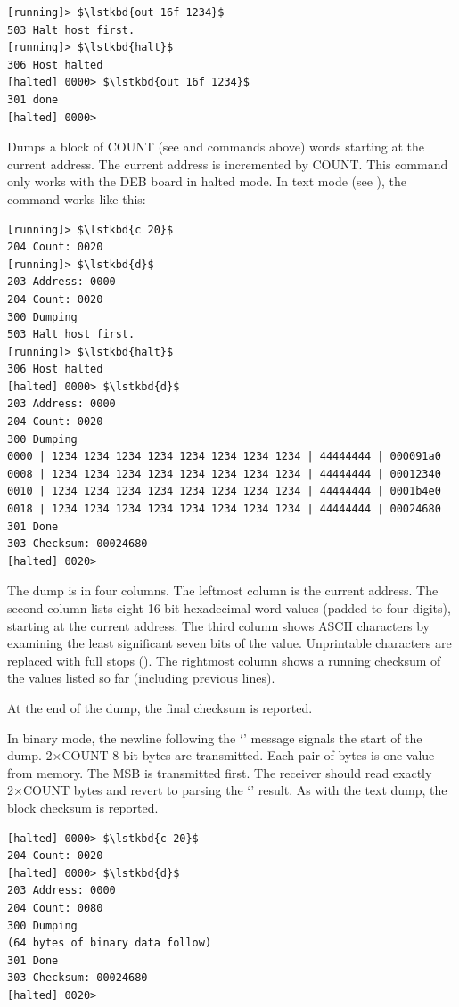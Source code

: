 \begin{description}
{\small
\begin{lstlisting}[style=deb]
[running]> $\lstkbd{out 16f 1234}$
503 Halt host first.
[running]> $\lstkbd{halt}$
306 Host halted
[halted] 0000> $\lstkbd{out 16f 1234}$
301 done
[halted] 0000> 
\end{lstlisting}
}


\item{\bfseries{}} Dumps a block of COUNT (see  and 
  commands above) words starting at the current address. The current
  address is incremented by COUNT. This command only works with the
  \gls{DEB} board in halted mode. In text mode (see ), the
  command works like this:

{\small
\begin{lstlisting}[style=deb]
[running]> $\lstkbd{c 20}$
204 Count: 0020
[running]> $\lstkbd{d}$
203 Address: 0000
204 Count: 0020
300 Dumping
503 Halt host first.
[running]> $\lstkbd{halt}$
306 Host halted
[halted] 0000> $\lstkbd{d}$
203 Address: 0000
204 Count: 0020
300 Dumping
0000 | 1234 1234 1234 1234 1234 1234 1234 1234 | 44444444 | 000091a0
0008 | 1234 1234 1234 1234 1234 1234 1234 1234 | 44444444 | 00012340
0010 | 1234 1234 1234 1234 1234 1234 1234 1234 | 44444444 | 0001b4e0
0018 | 1234 1234 1234 1234 1234 1234 1234 1234 | 44444444 | 00024680
301 Done
303 Checksum: 00024680
[halted] 0020>
\end{lstlisting}
}

The dump is in four columns. The leftmost column is the current
address. The second column lists eight 16-bit hexadecimal word values
(padded to four digits), starting at the current address. The third
column shows ASCII characters by examining the least significant seven
bits of the value. Unprintable characters are replaced with full stops
(). The rightmost column shows a running checksum of the values
listed so far (including previous lines).

At the end of the dump, the final checksum is reported.

In binary mode, the newline following the ‘’ message
signals the start of the dump. 2×COUNT 8-bit bytes are
transmitted. Each pair of bytes is one value from memory. The
\gls{MSB} is transmitted first. The receiver should read exactly
2×COUNT bytes and revert to parsing the ‘’ result. As
with the text dump, the block checksum is reported.

{\small
\begin{lstlisting}[style=deb]
[halted] 0000> $\lstkbd{c 20}$
204 Count: 0020
[halted] 0000> $\lstkbd{d}$
203 Address: 0000
204 Count: 0080
300 Dumping
(64 bytes of binary data follow)
301 Done
303 Checksum: 00024680
[halted] 0020>
\end{lstlisting}
}




\end{description}
